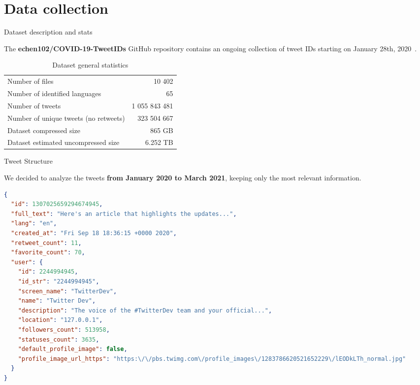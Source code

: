 \documentclass[8pt]{beamer}  %
\begin{document}
\section{Data collection}

\begin{frame}{Dataset description and stats}

	The \textbf{echen102/COVID-19-TweetIDs} GitHub repository contains an ongoing collection of tweet IDs starting on January 28th, 2020~\autocite{chen2020tracking}.
	
	\begin{table}[H]
        \centering
        \begin{tabular}{lr}
            Number of files & 10 402
            \\
            Number of identified languages & 65
            \\
            Number of tweets & 1 055 843 481
            \\
            Number of unique tweets (no retweets) & 323 504 667
            \\
            Dataset compressed size & 865 GB
            \\
            Dataset estimated uncompressed size & 6.252 TB
        \end{tabular}
        \caption{Dataset general statistics}
        \label{tab:dataset-stats}
    \end{table}

\end{frame}

\begin{frame}[fragile]{Tweet Structure}

    We decided to analyze the tweets \textbf{from January 2020 to March 2021}, keeping only the most relevant information.
	
    \begin{lstlisting}[language=json, caption={Final json object for a tweet}, captionpos=b, label={lst:tweet_json}]
{
  "id": 1307025659294674945,
  "full_text": "Here's an article that highlights the updates...",
  "lang": "en",
  "created_at": "Fri Sep 18 18:36:15 +0000 2020",
  "retweet_count": 11,
  "favorite_count": 70,
  "user": {
    "id": 2244994945,
    "id_str": "2244994945",
    "screen_name": "TwitterDev",
    "name": "Twitter Dev",
    "description": "The voice of the #TwitterDev team and your official...",
    "location": "127.0.0.1",
    "followers_count": 513958,
    "statuses_count": 3635,
    "default_profile_image": false,
    "profile_image_url_https": "https:\/\/pbs.twimg.com\/profile_images\/1283786620521652229\/lEODkLTh_normal.jpg"
  }
}
    \end{lstlisting}
	
\end{frame}
\end{document}
